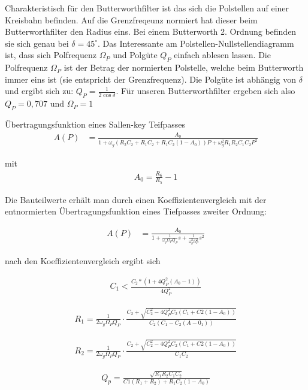\documentclass[11pt,twoside,a4paper,openright]{mpreport}
\begin{document}
Charakteristisch für den Butterworthfilter ist das sich die Polstellen auf einer Kreisbahn befinden. Auf die Grenzfreqeunz normiert hat dieser beim Butterworthfilter den Radius
eins. Bei einem Butterworth 2. Ordnung befinden sie sich genau bei $\delta=45^\circ$. Das Interessante am Polstellen-Nullstellendiagramm ist, dass sich Polfrequenz $\Omega_P$ und 
Polgüte $Q_P$ einfach ablesen lassen. Die Polfrequenz $\Omega_P$ ist der Betrag der normierten Polstelle, welche beim Butterworth immer eins ist (sie entspricht der Grenzfrequenz).
Die Polgüte ist abhängig von $\delta$ und ergibt sich zu: $Q_P=\frac{1}{2\cos{\delta}}$. Für unseren Butterworthfilter ergeben sich also $Q_P=0,707$ und $\Omega_P=1$


Übertragungsfunktion eines Sallen-key Teifpasses
\begin{align*}
A(P)&=\frac{A_0}{1+\omega_g (R_2 C_2 + R_1 C_2 + R_1 C_2(1-A_0))P + \omega_g^2R_1 R_2 C_1C_2P^2}
\end{align*}

mit
\begin{align*}
A_0=\frac{R_6}{R_5}-1
\end{align*}


Die Bauteilwerte erhält man durch einen Koeffizientenvergleich mit der entnormierten
Übertragungsfunktion eines Tiefpasses zweiter Ordnung:

\begin{align*}
A(P)&=\frac{A_0}{1+\frac{1}{\omega_g\Omega_PQ_P}s+\frac{1}{\omega_g^2\Omega_P^2}s^2}
\end{align*}

nach den Koeffizientenvergleich ergibt sich

\begin{align*}
C_1<\frac{C_2*(1+4Q^2_P(A_0-1))}{4Q^2_P}
\end{align*}

\begin{align*}
R_1=\frac{1}{2\omega_g\Omega_PQ_P} \cdot \frac{C_2+\sqrt{C_2^2-4Q^2_PC_2(C_1+C2(1-A_0))}}{C_2(C_1-C_2(A-0_1))}           
\end{align*}


\begin{align*}
R_2=\frac{1}{2\omega_g\Omega_PQ_P} \cdot \frac{C_2+\sqrt{C_2^2-4Q^2_PC_2(C_1+C2(1-A_0))}}{C_1C_2}           
\end{align*}


\begin{align*}
Q_p=\frac{\sqrt{R_1R_2C_1C_2}}{C1(R_1+R_2)+R_1C_2(1-A_0)}
\end{align*}
\end{document}
